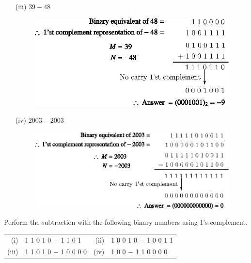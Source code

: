 \begin{solution}
\begin{itemize}
\eject

\item[(iii)] $39-48$
\begin{figure}[H]
\centering
\includegraphics[scale=.97]{chap5/div32.eps}
\end{figure}

\item[(iv)] $2003-2003$
\begin{figure}[H]
\centering
\includegraphics[scale=.97]{chap5/div33.eps}
\end{figure}
\end{itemize}
\end{solution}

\begin{problem}\label{prob5.29}
Perform the subtraction with the following binary numbers using 1's complement.
\begin{center}
\begin{tabular}{r@{\;\,}l@{\qquad\quad}r@{\;\,}l}
(i) & 1 1 0 1 0 $-$ 1 1 0 1 & (ii) & 1 0 0 1 0 $-$ 1 0 0 1 1\\[4pt] 
(iii) & 1 1 0 1 0 $-$ 1 0 0 0 0 & (iv) & 1 0 0 $-$ 1 1 0 0 0 0 
\end{tabular}
\end{center}
\end{problem}

